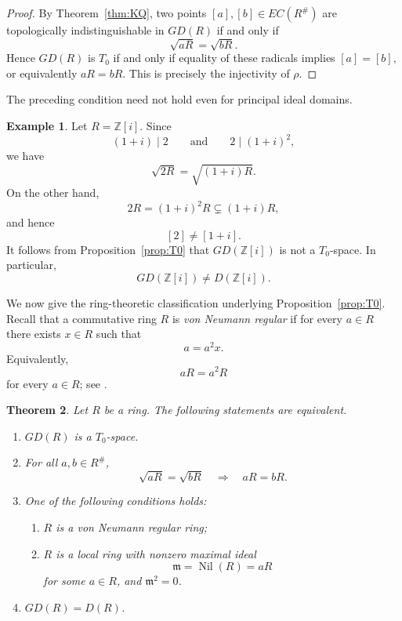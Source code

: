 \documentclass[11pt]{amsart}
\theoremstyle{plain}
\newtheorem{theorem}{Theorem}[section]
\theoremstyle{definition}
\newtheorem{example}[theorem]{Example}
\theoremstyle{remark}
\numberwithin{equation}{section}
\begin{document}
\begin{proof}
	By Theorem~\ref{thm:KQ}, two points $[a],[b]\in EC(R^\#)$ are
	topologically indistinguishable in $GD(R)$ if and only if
	\[
	\sqrt{aR}=\sqrt{bR}.
	\]
	Hence $GD(R)$ is $T_0$ if and only if equality of these radicals implies
	$[a]=[b]$, or equivalently $aR=bR$. This is precisely the injectivity of
	$\rho$.
\end{proof}


The preceding condition need not hold even for principal ideal domains.

\begin{example}\label{ex:Gaussian}
	Let $R=\mathbb Z[i]$. Since
	\[
	(1+i)\mid2
	\qquad\text{and}\qquad
	2\mid(1+i)^2,
	\]
	we have
	\[
	\sqrt{2R}=\sqrt{(1+i)R}.
	\]
	On the other hand,
	\[
	2R=(1+i)^2R\subsetneq(1+i)R,
	\]
	and hence
	\[
	[2]\neq[1+i].
	\]
	It follows from Proposition~\ref{prop:T0} that $GD(\mathbb Z[i])$ is not
	a $T_0$-space. In particular,
	\[
	GD(\mathbb Z[i])\neq D(\mathbb Z[i]).
	\]
\end{example}


We now give the ring-theoretic classification underlying
Proposition~\ref{prop:T0}. Recall that a commutative ring $R$ is
\emph{von Neumann regular} if for every $a\in R$ there exists $x\in R$
such that
\[
a=a^2x.
\]
Equivalently,
\[
aR=a^2R
\]
for every $a\in R$; see \cite{von,Brewer}.

\begin{theorem}\label{thm:T0-classification}
	Let $R$ be a ring. The following statements are equivalent.
	\begin{enumerate}
		\item $GD(R)$ is a $T_0$-space.
		
		\item For all $a,b\in R^\#$,
		\[
		\sqrt{aR}=\sqrt{bR}
		\quad\Longrightarrow\quad
		aR=bR.
		\]
		
		\item One of the following conditions holds:
		\begin{enumerate}
			\item $R$ is a von Neumann regular ring;
			\item $R$ is a local ring with nonzero maximal ideal
			\[
			\mathfrak m=\operatorname{Nil}(R)=aR
			\]
			for some $a\in R$, and $\mathfrak m^2=0$.
		\end{enumerate}
		
		\item $GD(R)=D(R)$.
	\end{enumerate}
\end{theorem}
\end{document}
